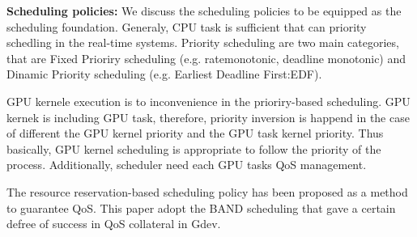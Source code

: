 

\textbf{Scheduling policies:}
We discuss the scheduling policies to be equipped as the scheduling foundation.
Generaly, CPU task is sufficient that can priority schedling in the real-time systems.
Priority scheduling are two main categories, that are Fixed Prioriry scheduling (e.g. ratemonotonic, deadline monotonic) and Dinamic Priority scheduling (e.g. Earliest Deadline First:EDF).


GPU kernele execution is to inconvenience in the prioriry-based scheduling.
GPU kernek is including GPU task, therefore, priority inversion is happend in the case of different the GPU kernel priority and the GPU task kernel priority.
Thus basically, GPU kernel scheduling is appropriate to follow the priority of the process.
Additionally, scheduler need each GPU tasks QoS management.


The resource reservation-based scheduling policy has been proposed\cite{gdev,cbs,tbs} as a method to guarantee QoS.
This paper adopt the BAND scheduling that gave a certain defree of success in QoS collateral in Gdev.

